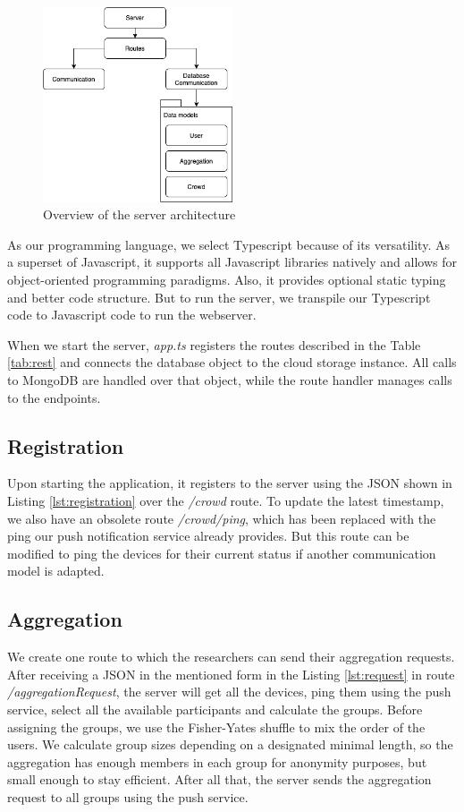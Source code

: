 \begin{figure}[htpb]
  \centering
  \includegraphics[width=0.5\textwidth]{figures/server}
  \caption{Overview of the server architecture} \label{fig:server}
\end{figure}

As our programming language, we select Typescript because of its versatility. As a superset of Javascript, it supports all Javascript libraries natively and allows for object-oriented programming paradigms. Also, it provides optional static typing and better code structure. But to run the server, we transpile our Typescript code to Javascript code to run the webserver.

When we start the server, \textit{app.ts} registers the routes described in the Table \ref{tab:rest} and connects the database object to the cloud storage instance. All calls to MongoDB are handled over that object, while the route handler manages calls to the endpoints.

\subsection{Registration}
Upon starting the application, it registers to the server using the JSON shown in Listing \ref{lst:registration} over the \textit{/crowd} route. To update the latest timestamp, we also have an obsolete route \textit{/crowd/ping}, which has been replaced with the ping our push notification service already provides. But this route can be modified to ping the devices for their current status if another communication model is adapted.

\subsection{Aggregation}
We create one route to which the researchers can send their aggregation requests. After receiving a JSON in the mentioned form in the Listing \ref{lst:request} in route \textit{/aggregationRequest}, the server will get all the devices, ping them using the push service, select all the available participants and calculate the groups. Before assigning the groups, we use the Fisher-Yates shuffle to mix the order of the users. We calculate group sizes depending on a designated minimal length, so the aggregation has enough members in each group for anonymity purposes, but small enough to stay efficient. After all that, the server sends the aggregation request to all groups using the push service.

